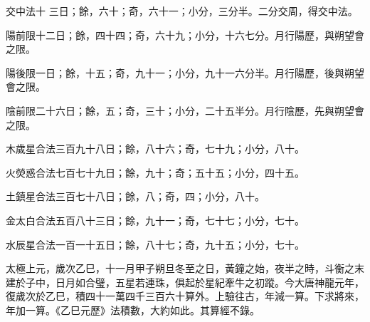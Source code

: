 \begin{pinyinscope}
 交中法十
 三日；餘，六十；奇，六十一；小分，三分半。二分交周，得交中法。



 陽前限十二日；餘，四十四；奇，六十九；小分，十六七分。月行陽歷，與朔望會之限。



 陽後限一日；餘，十五；奇，九十一；小分，九十一六分半。月行陽歷，後與朔望會之限。



 陰前限二十六日；餘，五；奇，三十；小分，二十五半分。月行陰歷，先與朔望會之限。



 木歲星合法三百九十八日；餘，八十六；奇，七十九；小分，八十。



 火熒惑合法七百七十九日；餘，九十；奇；五十五；小分，四十五。



 土鎮星合法三百七十八日；餘，八；奇，四；小分，八十。



 金太白合法五百八十三日；餘，九十一；奇，七十七；小分，七十。



 水辰星合法一百一十五日；餘，八十七；奇，九十五；小分，七十。



 太極上元，歲次乙巳，十一月甲子朔旦冬至之日，黃鐘之始，夜半之時，斗衡之末建於子中，日月如合璧，五星若連珠，俱起於星紀牽牛之初蹤。今大唐神龍元年，復歲次於乙巳，積四十一萬四千三百六十算外。上驗往古，年減一算。下求將來，年加一算。《乙巳元歷》法積數，大約如此。其算經不錄。



\end{pinyinscope}